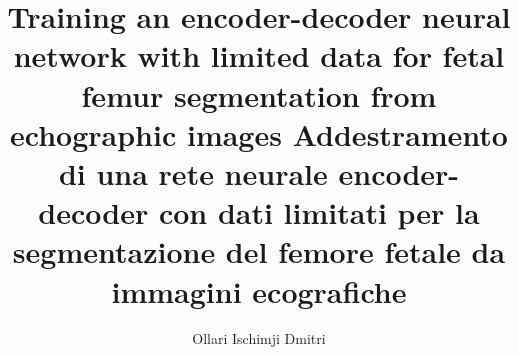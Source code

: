 \documentclass[12pt, a4paper, twoside]{book}
\let\origdoublepage\cleardoublepage
\newcommand{\clearemptydoublepage}{%
	\clearpage
	{\pagestyle{empty}\origdoublepage}%
}
\let\cleardoublepage\clearemptydoublepage
\begin{document}
\title{
	Training an encoder-decoder neural network with limited data for fetal femur segmentation from echographic images \newline
	\large Addestramento di una rete neurale encoder-decoder con dati limitati per la segmentazione del femore fetale da immagini ecografiche}
\author{Ollari Ischimji Dmitri}

\maketitle

\cleardoublepage

\tableofcontents
\cleardoublepage
\listoffigures
\cleardoublepage
\listoftables
\cleardoublepage







\cleardoublepage
% 


\end{document}
